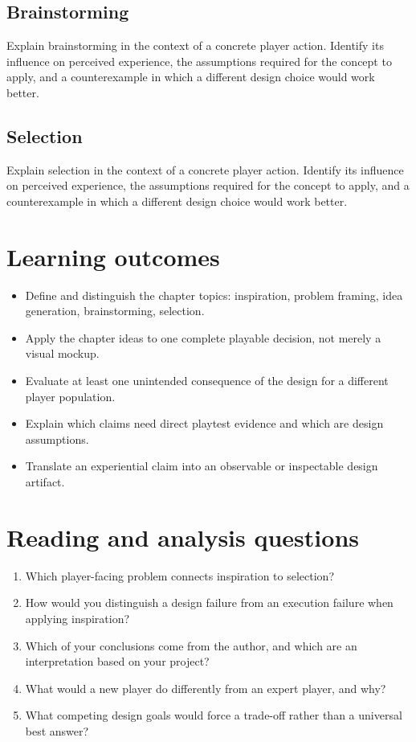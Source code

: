\documentclass[11pt]{article}
\begin{document}
\subsection{Brainstorming}
Explain brainstorming in the context of a concrete player action. Identify its influence on perceived experience, the assumptions required for the concept to apply, and a counterexample in which a different design choice would work better.


\subsection{Selection}
Explain selection in the context of a concrete player action. Identify its influence on perceived experience, the assumptions required for the concept to apply, and a counterexample in which a different design choice would work better.


\section{Learning outcomes}
\begin{itemize}
\item Define and distinguish the chapter topics: inspiration, problem framing, idea generation, brainstorming, selection.
\item Apply the chapter ideas to one complete playable decision, not merely a visual mockup.
\item Evaluate at least one unintended consequence of the design for a different player population.
\item Explain which claims need direct playtest evidence and which are design assumptions.
\item Translate an experiential claim into an observable or inspectable design artifact.
\end{itemize}

\section{Reading and analysis questions}
\begin{enumerate}
\item Which player-facing problem connects inspiration to selection?
\item How would you distinguish a design failure from an execution failure when applying inspiration?
\item Which of your conclusions come from the author, and which are an interpretation based on your project?
\item What would a new player do differently from an expert player, and why?
\item What competing design goals would force a trade-off rather than a universal best answer?
\end{enumerate}
\end{document}
